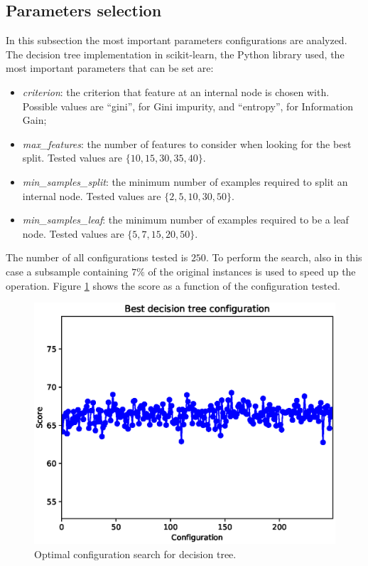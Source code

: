 \documentclass[a4paper, 10pt]{article}
\begin{document}
\subsection{Parameters selection}

In this subsection the most important parameters configurations are analyzed. The decision tree implementation in scikit-learn, the Python library used, the most important parameters that can be set are:
\begin{itemize}
 \item \emph{criterion}: the criterion that feature at an internal node is chosen with. Possible values are ``gini'', for Gini impurity, and ``entropy'', for Information Gain;
 \item \emph{max\_features}: the number of features to consider when looking for the best split. Tested values are $\{10, 15, 30, 35, 40\}$.
 \item \emph{min\_samples\_split}: the minimum number of examples required to split an internal node. Tested values are $\{2, 5, 10, 30, 50\}$.
 \item \emph{min\_samples\_leaf}: the minimum number of examples required to be a leaf node. Tested values are $\{5, 7, 15, 20, 50\}$.
\end{itemize}

The number of all configurations tested is $250$. To perform the search, also in this case a subsample containing $7\%$ of the original instances is used to speed up the operation. Figure \ref{fig:dt_config} shows the score as a function of the configuration tested.

\begin{figure}[H]
 \centering
 \includegraphics[width=0.8\linewidth]{pictures/decision_tree_config.eps}
 \caption{Optimal configuration search for decision tree.}
 \label{fig:dt_config}
\end{figure}
\end{document}
